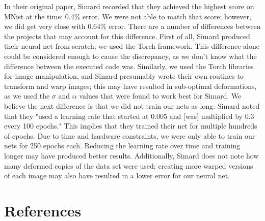 \documentclass{article}
\begin{document}
In their original paper, Simard recorded that they achieved the highest score on MNist at the time: 0.4\% error. We were not able to match that score; however, we did get very close with 0.64\% error. There are a number of differences between the projects that may account for this difference. First of all, Simard produced their neural net from scratch; we used the Torch framework. This difference alone could be considered enough to cause the discrepancy, as we don't know what the difference between the executed code was. Similarly, we used the Torch libraries for image manipulation, and Simard presumably wrote their own routines to transform and warp images; this may have resulted in sub-optimal deformations, as we used the $\sigma$ and $\alpha$ values that were found to work best for Simard. We believe the next difference is that we did not train our nets as long. Simard noted that they "used  a  learning  rate  that  
started  at  0.005  and  [was]  multiplied  by  0.3  every  100  
epochs." This implies that they trained their net for multiple hundreds of epochs. Due to time and hardware constraints, we were only able to train our nets for 250 epochs each. Reducing the learning rate over time and training longer may have produced better results. Additionally, Simard does not note how many deformed copies of the data set were used; creating more warped versions of each image may also have resulted in a lower error for our neural net.
\section{References}


\end{document}
